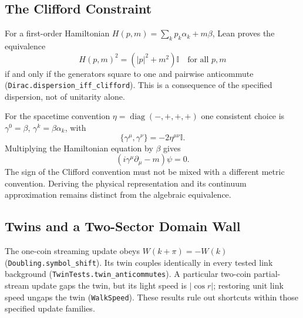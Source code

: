 \subsection{The Clifford Constraint}
For a first-order Hamiltonian $H(p,m)=\sum_k p_k\alpha_k+m\beta$, Lean proves the equivalence
\begin{equation}
 H(p,m)^2=(|p|^2+m^2)\mathbb I\quad\text{for all }p,m
\end{equation}
if and only if the generators square to one and pairwise anticommute (\nolinkurl{Dirac.dispersion_iff_clifford}). This is a consequence of the specified dispersion, not of unitarity alone.

For the spacetime convention $\eta=\operatorname{diag}(-,+,+,+)$ one consistent choice is $\gamma^0=\beta$, $\gamma^k=\beta\alpha_k$, with
\begin{equation}
 \{\gamma^\mu,\gamma^\nu\}=-2\eta^{\mu\nu}\mathbb I.
 \label{eq:anti_commute}
\end{equation}
Multiplying the Hamiltonian equation by $\beta$ gives
\begin{equation}
 (i\gamma^\mu\partial_\mu-m)\psi=0.
 \label{eq:covariant_dirac}
\end{equation}
The sign of the Clifford convention must not be mixed with a different metric convention. Deriving the physical representation and its continuum approximation remains distinct from the algebraic equivalence.

\subsection{Twins and a Two-Sector Domain Wall}
The one-coin streaming update obeys $W(k+\pi)=-W(k)$ (\nolinkurl{Doubling.symbol_shift}). Its twin couples identically in every tested link background (\nolinkurl{TwinTests.twin_anticommutes}). A particular two-coin partial-stream update gaps the twin, but its light speed is $|\cos r|$; restoring unit link speed ungaps the twin (\nolinkurl{WalkSpeed}). These results rule out shortcuts within those specified update families.

